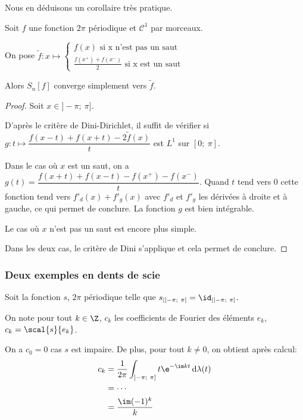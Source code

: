 Nous en déduisons un corollaire très pratique.

\begin{cor}
Soit $f$ une fonction $2\pi$ périodique et $\mathcal{C}^1$ par morceaux. 

On pose $\tilde{f}: x \mapsto \begin{cases}
f(x) \text{ si x n'est pas un saut} \\
\frac{f(x^+)+f(x^-)}{2} \text{ si x est un saut}
\end{cases}$

Alors $S_n[f]$ converge simplement vers $\tilde{f}$.
\end{cor}

\begin{proof}
Soit $x \in ]-\pi;~\pi]$. 

D'après le critère de Dini-Dirichlet, il suffit de vérifier si $g: t \mapsto \dfrac{f(x-t)+f(x+t)-2\tilde{f}(x)}{t}$ est $L^1$ sur $[0;~\pi]$.

Dans le cas où $x$ est un saut, on a $g(t) = \dfrac{f(x+t)+f(x-t)-f(x^+)-f(x^-)}{t}$. Quand $t$ tend vers $0$ cette fonction tend vers $f'_d(x) + f'_g(x)$ avec $f'_d$ et $f'_g$ les dérivées à droite et à gauche, ce qui permet de conclure. La fonction $g$ est bien intégrable.

Le cas où $x$ n'est pas un saut est encore plus simple.

Dans les deux cas, le critère de Dini s'applique et cela permet de conclure.
\end{proof}

\subsubsection{Deux exemples en dents de scie}

Soit la fonction $s$, $2\pi$ périodique telle que $s_{|]-\pi;~\pi]} = \id_{|]-\pi;~\pi]}$.

On note pour tout $k\in \Z$, $c_k$ les coefficients de Fourier des éléments $e_k$, $c_k = \scal{s}{e_k}$.

On a $c_0 = 0$ cas $s$ est impaire. De plus, pour tout $k \neq 0$, on obtient après calcul:
\begin{align*}
c_k & = \frac{1}{2\pi} \int_{]-\pi;~\pi]} t\e^{-\im k t} \, \mathrm d \lambda(t) \\
 & = \cdots \\
  & = \dfrac{\im (-1)^k}{k}
\end{align*}


